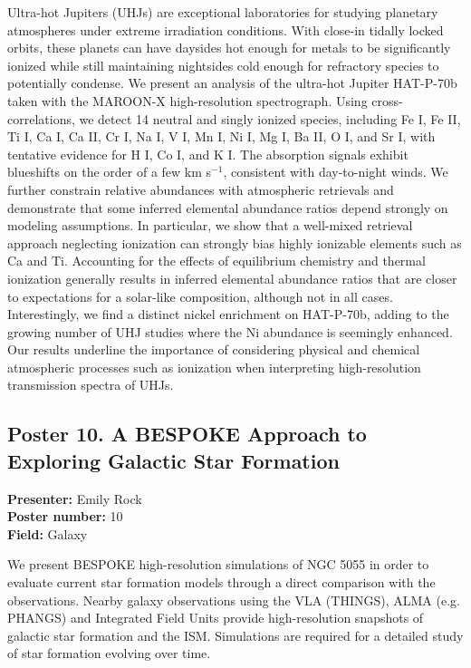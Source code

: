 Ultra-hot Jupiters (UHJs) are exceptional laboratories for studying planetary atmospheres under extreme irradiation conditions. With close-in tidally locked orbits, these planets can have daysides hot enough for metals to be significantly ionized while still maintaining nightsides cold enough for refractory species to potentially condense. We present an analysis of the ultra-hot Jupiter HAT-P-70b taken with the MAROON-X high-resolution spectrograph. Using cross-correlations, we detect 14 neutral and singly ionized species, including Fe I, Fe II, Ti I, Ca I, Ca II, Cr I, Na I, V I, Mn I, Ni I, Mg I, Ba II, O I, and Sr I, with tentative evidence for H I, Co I, and K I. The absorption signals exhibit blueshifts on the order of a few km s$^{-1}$, consistent with day-to-night winds. We further constrain relative abundances with atmospheric retrievals and demonstrate that some inferred elemental abundance ratios depend strongly on modeling assumptions. In particular, we show that a well-mixed retrieval approach neglecting ionization can strongly bias highly ionizable elements such as Ca and Ti. Accounting for the effects of equilibrium chemistry and thermal ionization generally results in inferred elemental abundance ratios that are closer to expectations for a solar-like composition, although not in all cases. Interestingly, we find a distinct nickel enrichment on HAT-P-70b, adding to the growing number of UHJ studies where the Ni abundance is seemingly enhanced. Our results underline the importance of considering physical and chemical atmospheric processes such as ionization when interpreting high-resolution transmission spectra of UHJs.

\hypertarget{poster-abstract-talk-236}{}\label{poster-abstract-page-talk-236}
\subsection*{Poster 10. A BESPOKE Approach to Exploring Galactic Star Formation}
\textbf{Presenter:} Emily Rock\\
\textbf{Poster number:} 10\\
\textbf{Field:} Galaxy

We present BESPOKE high-resolution simulations of NGC 5055 in order to evaluate current star formation models through a direct comparison with the observations. Nearby galaxy observations using the VLA (THINGS), ALMA (e.g. PHANGS) and Integrated Field Units provide high-resolution snapshots of galactic star formation and the ISM. Simulations are required for a detailed study of star formation evolving over time.

